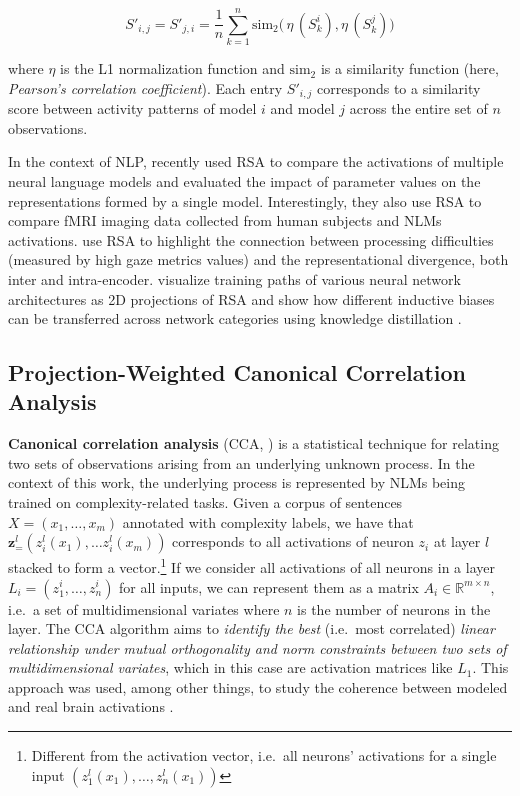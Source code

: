 \documentclass[a4paper, nobind]{templates/ociamthesis}
\begin{document}
\begin{equation}
S'_{i,j} = S'_{j,i} = \frac{1}{n}\sum_{k=1}^n \text{sim}_2\big(\,\eta\,(S^i_k),\eta\,(S^j_k)\big)
\end{equation}

where \(\eta\) is the L1 normalization function and \(\text{sim}_2\) is a similarity function (here, \emph{Pearson's correlation coefficient}). Each entry \(S'_{i,j}\) corresponds to a similarity score between activity patterns of model \(i\) and model \(j\) across the entire set of \(n\) observations.

In the context of NLP, \textcite{abnar-etal-2019-blackbox} recently used RSA to compare the activations of multiple neural language models and evaluated the impact of parameter values on the representations formed by a single model. Interestingly, they also use RSA to compare fMRI imaging data collected from human subjects and NLMs activations. \textcite{abdou-etal-2019-higher} use RSA to highlight the connection between processing difficulties (measured by high gaze metrics values) and the representational divergence, both inter and intra-encoder. \textcite{abnar-etal-2020-transferring} visualize training paths of various neural network architectures as 2D projections of RSA and show how different inductive biases can be transferred across network categories using knowledge distillation \autocite{hinton-etal-2015-distilling}.

\hypertarget{subsubchap:pwcca}{%
\subsection{Projection-Weighted Canonical Correlation Analysis}\label{subsubchap:pwcca}}

\textbf{Canonical correlation analysis} (CCA, \textcite{thompson-1984-canonical}) is a statistical technique for relating two sets of observations arising from an underlying unknown process. In the context of this work, the underlying process is represented by NLMs being trained on complexity-related tasks. Given a corpus of sentences \(X = (x_1, \dots, x_m)\) annotated with complexity labels, we have that \(\boldsymbol z^l_ = (z_i^l(x_1), \dots z_i^l(x_m))\) corresponds to all activations of neuron \(z_i\) at layer \(l\) stacked to form a vector.\footnote{Different from the activation vector, i.e.~all neurons' activations for a single input \((z^l_1(x_1),\dots,z^l_n(x_1))\)} If we consider all activations of all neurons in a layer \(L_i = (z^i_1, \dots, z^i_n)\) for all inputs, we can represent them as a matrix \(A_i \in \mathbb{R}^{m \times n}\), i.e.~a set of multidimensional variates where \(n\) is the number of neurons in the layer. The CCA algorithm aims to \emph{identify the best} (i.e.~most correlated) \emph{linear relationship under mutual orthogonality and norm constraints between two sets of multidimensional variates}, which in this case are activation matrices like \(L_1\). This approach was used, among other things, to study the coherence between modeled and real brain activations \autocite{sussillo-etal-2015-neural}.
\end{document}
